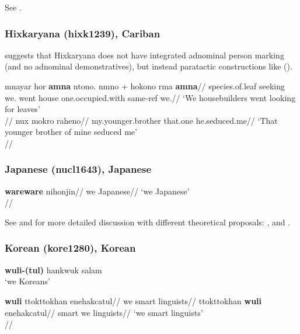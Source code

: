 \documentclass[A4paper]{article}
\begin{document}
See \citet[197, 199]{nedjalkov1997}.



\subsubsection{Hixkaryana (hixk1239), Cariban}

\citet[131]{derbyshire1979} suggests that Hixkaryana does not have integrated adnominal person marking (and no adnominal demonstratives), but instead paratactic constructions like (\nextx).

\pex
\a
\begingl
\gla m\textbari{}nayar\textbari{} hor\textbari{} \textbf{amna} ntono. n\textbari{}mno + hokono rma \textbf{amna}//
\glb species.of.leaf seeking we.\Excl{} went house {one.occupied.with} same-ref we.\Excl{}//
\glft `We housebuilders went looking for leaves'\\{\citep[131, (290)]{derbyshire1979}}//
\endgl
\a
\begingl
\gla nux mokro raheno//
\glb my.younger.brother that.one he.seduced.me//
\glft `That younger brother of mine seduced me'\\{\citep[132, (293a)]{derbyshire1979}}//
\endgl
\xe



\subsubsection{Japanese (nucl1643), Japanese} 

\ex \begingl
\gla \textbf{wareware} nihonjin//
\glb we Japanese//
\glft `we Japanese'\\\citep[254]{hinds1988}//
\endgl
\xe

See \citet[254, 261]{hinds1988} and for more detailed discussion with different theoretical proposals: \citet[780]{noguchi1997}, \citet[sec. 3.2]{furuya2008} and \citet{inokuma2009}.

\subsubsection{Korean (kore1280), Korean}


\ex \textbf{wuli-(tul)} hankwuk salam\\
 `we Koreans'\\
 \citep[292]{sohn1994}
 \xe
 
\pex
\a \begingl
\gla \textbf{wuli} ttokttokhan enehakcatul//
\glb we smart linguists//
\endgl
\a \begingl
\gla ttokttokhan \textbf{wuli} enehakcatul//
\glb smart we linguists//
\glft `we smart linguists'\\\citep[151, (15)]{choi2014phd}//
\endgl
\xe
\end{document}
